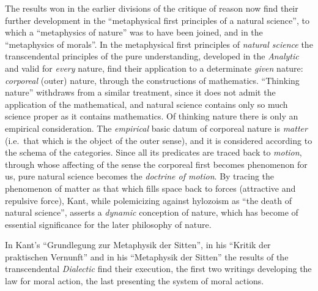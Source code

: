 \divrule

The results won in the earlier divisions of the critique of reason now
find their further development in the ``metaphysical first principles of
a natural science'', to which a ``metaphysics of nature'' was to have
been joined, and in the ``metaphysics of morals''. In the metaphysical
first principles of \emph{natural science} the transcendental principles
of the pure understanding, developed in the \emph{Analytic} and valid for
\emph{every} nature, find their application to a determinate
\emph{given} nature: \emph{corporeal} (outer) nature, through the
constructions of mathematics. ``Thinking nature'' withdraws from a
similar treatment, since it does not admit the application of the
mathematical, and natural science contains only so much science proper
as it contains mathematics. Of thinking nature there is only an
empirical consideration. The \emph{empirical} basic datum of corporeal
nature is \emph{matter} (i.e.\ that which is the object of the outer
sense), and it is considered according to the schema of the categories.
Since all its predicates are traced back to \emph{motion}, through whose
affecting of the sense the corporeal first becomes phenomenon for us,
pure natural science becomes the \emph{doctrine of motion}. By tracing
the phenomenon of matter as that which fills space back to forces
(attractive and repulsive force), Kant, while polemicizing
against hylozoism as ``the death of natural science'', asserts a
\emph{dynamic} conception of nature, which has become of essential
significance for the later philosophy of nature.

\divrule

In Kant's ``Grundlegung zur Metaphysik der Sitten'', in his ``Kritik der
praktischen Vernunft'' and in his ``Metaphysik der Sitten'' the results
of the transcendental \emph{Dialectic} find their execution, the first
two writings developing the law for moral action, the last presenting
the system of moral actions.

